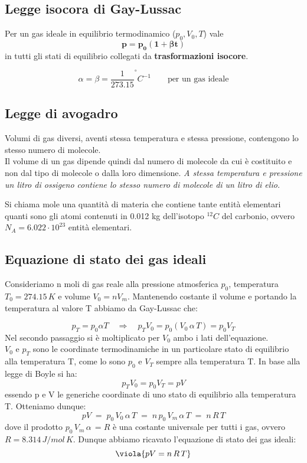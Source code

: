\begin{center}
	\colorbox{yred}{\begin{minipage}{5.75in}
			\begin{redes}{}
				\subsection{Legge isocora di Gay-Lussac}
				Per un gas ideale in equilibrio termodinamico (\(p_{0}, V_{0}, T\)) vale
				\[ 
				\boldsymbol{p = p_0(1 + \beta t)}
				\]
				in tutti gli stati di equilibrio collegati da \textbf{trasformazioni isocore}.
				
				\[ 
				\alpha = \beta = \frac{1}{273.15} ^\circ C^{-1} \qquad \text{per un gas ideale}
				\]
			\end{redes}
	\end{minipage}}
\end{center}


\subsection{Legge di avogadro}
Volumi di gas diversi, aventi stessa temperatura e stessa pressione, contengono lo stesso numero di molecole.\\
Il volume di un gas dipende quindi dal numero di molecole da cui è costituito e non dal tipo di molecole o dalla loro dimensione. \textit{A stessa temperatura e pressione un litro di ossigeno contiene lo stesso numero di molecole di un litro di elio.}

Si chiama mole una quantità di materia che contiene tante entità elementari quanti sono gli atomi contenuti in 0.012 kg dell'isotopo $^{12}C$ del carbonio, ovvero $N_A = 6.022\cdot10^{23}$ entità elementari. 

\subsection{Equazione di stato dei gas ideali}
Consideriamo n moli di gas reale alla pressione atmosferica $p_0$, temperatura $T_0 = 274.15\,K$ e volume $V_0 = nV_m$.
Mantenendo costante il volume e portando la temperatura al valore T abbiamo da Gay-Lussac che: 

\[ 
p_T = p_0 \alpha T \quad \Longrightarrow \quad p_T V_0 = p_0 (V_0 \,\alpha\, T) = p_0 V_T
\]
Nel secondo passaggio si è moltiplicato per $V_0$ ambo i lati dell'equazione.\\ $V_0$ e $p_T$ sono le coordinate termodinamiche in un particolare stato di equilibrio alla temperatura T, come lo sono $p_0$ e $V_T$ sempre alla temperatura T. In base alla legge di Boyle si ha: 
\[ 
p_T V_0  = p_0 V_T = pV
\]
essendo p e V le generiche coordinate di uno stato di equilibrio alla temperatura T. Otteniamo dunque:
\[ 
pV \;=\; p_0 \,V_0\, \alpha\, T \;=\; n\, p_0\, V_m\, \alpha\, T \;=\; n\, R\, T  
\]
dove il prodotto $p_0\, V_m\, \alpha\, = R$  è una costante universale per tutti i gas, ovvero $R = 8.314\, J/mol\,K$. Dunque abbiamo ricavato l'equazione di stato dei gas ideali: 
\begin{equation}
	\viola{pV = n\,R\,T }
\end{equation}

